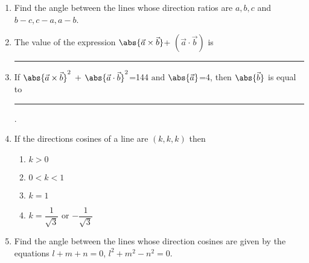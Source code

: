 \begin{enumerate}[label=\thesubsection.\arabic*,ref=\thesubsection.\theenumi]
\\
    \solution
		
\item
Find the angle between the lines whose direction ratios are $a,b,c$ and $b-c,c-a,a-b$.
\\
\solution

\item The value of the expression $\abs{\vec{a}\times\vec{b}}$+ $({\vec{a}\cdot\vec{b}})$ is \rule{1cm}{0.15mm}
\item If $\abs{\vec{a}\times\vec{b}}^2$ + $\abs{\vec{a}\cdot\vec{b}}^2$=144 $\text{and}$  $\abs{\vec{a}}$=4, then $\abs{\vec{b}}$ is equal to \rule{1cm}{0.15mm}.
\item If the directions cosines of a line are $(k,k,k)$ then
\begin{enumerate}
	\item $k>0$
	\item $0<k<1$
	\item $k=1$ 
	\item $k=\dfrac{1}{\sqrt{3}}$ or $-\dfrac{1}{\sqrt{3}}$
\end{enumerate}
\item Find the angle between the lines whose direction cosines are given by the equations $l+m+n=0$, $l^2+m^2-n^2=0$.
\end{enumerate}
